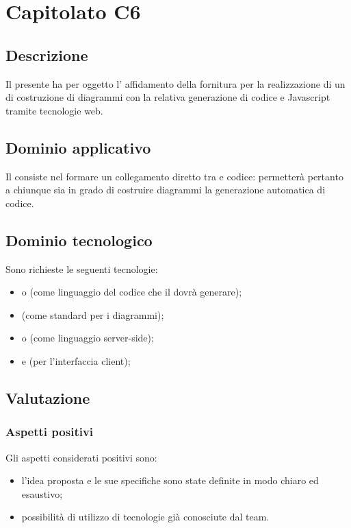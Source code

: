 \section {Capitolato C6}
	\subsection {Descrizione}
	Il presente  ha per oggetto l’ affidamento della fornitura per la realizzazione
di un  di costruzione di diagrammi  con la relativa generazione di codice
 e Javascript tramite tecnologie web.
	\subsection {Dominio applicativo}
	Il  consiste nel formare un collegamento diretto tra  e codice: permetterà pertanto a chiunque sia in grado di costruire diagrammi  la generazione automatica di codice.
	\subsection {Dominio tecnologico}
	Sono richieste le seguenti tecnologie:
	\begin {itemize}
	\item \textbf{} o \textbf{} (come linguaggio del codice che il  dovrà generare);
	\item \textbf{} (come standard per i diagrammi);
	\item \textbf{} o \textbf{} (come linguaggio server-side);
	\item \textbf{} e \textbf{} (per l'interfaccia client);
	\end {itemize}
	\subsection {Valutazione}
		\subsubsection {Aspetti positivi}
		Gli aspetti considerati positivi sono:
			\begin {itemize}
			 	\item l'idea proposta e le sue specifiche sono state definite in modo chiaro ed esaustivo;
			 	\item possibilità di utilizzo di tecnologie già conosciute dal team.
			\end {itemize}
